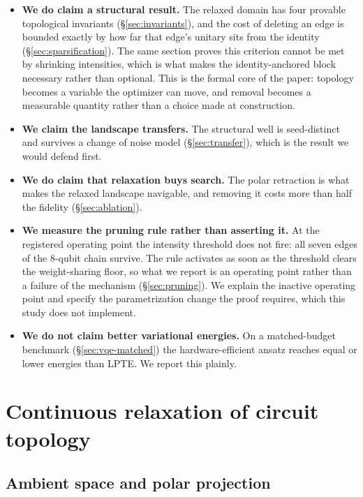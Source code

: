 \documentclass[twocolumn,aps,prl,superscriptaddress,showkeys]{revtex4-2}
\theoremstyle{plain}
\theoremstyle{definition}
\begin{document}
\begin{itemize}
\item \textbf{We do claim a structural result.} The relaxed domain has four provable topological invariants (\S\ref{sec:invariants}), and the cost of deleting an edge is bounded exactly by how far that edge's unitary sits from the identity (\S\ref{sec:sparsification}). The same section proves this criterion cannot be met by shrinking intensities, which is what makes the identity-anchored block necessary rather than optional. This is the formal core of the paper: topology becomes a variable the optimizer can move, and removal becomes a measurable quantity rather than a choice made at construction.
\item \textbf{We claim the landscape transfers.} The structural well is seed-distinct and survives a change of noise model (\S\ref{sec:transfer}), which is the result we would defend first.
\item \textbf{We do claim that relaxation buys search.} The polar retraction is what makes the relaxed landscape navigable, and removing it costs more than half the fidelity (\S\ref{sec:ablation}).
\item \textbf{We measure the pruning rule rather than asserting it.} At the registered operating point the intensity threshold does not fire: all seven edges of the 8-qubit chain survive. The rule activates as soon as the threshold clears the weight-sharing floor, so what we report is an operating point rather than a failure of the mechanism (\S\ref{sec:pruning}). We explain the inactive operating point and specify the parametrization change the proof requires, which this study does not implement.
\item \textbf{We do not claim better variational energies.} On a matched-budget benchmark (\S\ref{sec:vqe-matched}) the hardware-efficient ansatz reaches equal or lower energies than LPTE. We report this plainly.
\end{itemize}

\section{Continuous relaxation of circuit topology}
\label{sec:relaxation}

\subsection{Ambient space and polar projection}
\end{document}

